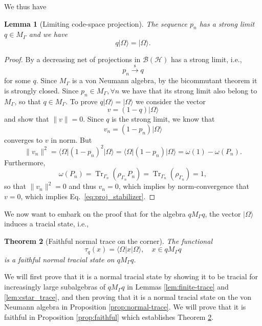 \documentclass[aps,pra,reprint,superscriptaddress]{revtex4-2}
\newcommand{\cB}{{\mathcal B}}
\newcommand{\cH}{{\mathcal H}}
\newcommand\G{\Gamma}
\renewcommand\r{\rho}
\newcommand\w{\omega}
\newcommand\W{\Omega}
\providecommand{\ket}[1]{\lvert #1\rangle}
\providecommand{\bra}[1]{\langle #1\rvert}
\providecommand{\Tr}{\operatorname{Tr}}
\providecommand{\norm}[1]{\lVert #1\rVert}
\newtheorem{theorem}{Theorem}
\newtheorem{lemma}[theorem]{Lemma}
\theoremstyle{definition}
\theoremstyle{remark}
\begin{document}
We thus have
\begin{lemma}[Limiting code-space projection]\label{lem:q_exists}
    The sequence $p_n$ has a strong limit $q \in M_\G$ and we have 
    \begin{equation}\label{eq:proj_stabilizer}
        q \ket{\W} = \ket{\W}.
    \end{equation}    
\end{lemma}
\begin{proof}
    By \cite[I.5.1.3]{Blackadar} a decreasing net of projections in $\cB(\cH)$ has
a strong limit, i.e.,
\begin{equation}
    p_n \xrightarrow{\mathrm{s}} q
\end{equation}
for some $q$. Since $M_\G$ is a von Neumann algebra, by the bicommutant theorem
\cite[I.9.1.2]{Blackadar} it is strongly closed. Since $p_n \in M_\G, \forall
n$ we have that its strong limit also belong to $M_\G$, so that $q \in M_\G$.
To prove $q \ket{\W} = \ket{\W}$ we consider the vector
\begin{equation}
    v = (1-q) \ket{\W}
\end{equation}
and show that $\norm{v} = 0$. Since $q$ is the strong limit, we know that 
\begin{equation}
    v_n = (1-p_n) \ket{\W}
\end{equation}
converges to $v$ in norm. But
\begin{equation}
    \norm{v_n}^2 = \bra{\W}(1-p_n)^2 \ket{\W} = \bra{\W}(1-p_n)\ket{\W} = \w(1)
    - \w(P_n).
\end{equation}
Furthermore,
\begin{equation}
    \w(P_n) = \Tr_{\G_n}(\r_{\G_n}P_n)
    = \Tr_{\G_n}(\r_{\G_n}) = 1,
\end{equation}
so that $\norm{v_n}^2 = 0$ and thus $v_n = 0$, which implies by
norm-convergence that $v = 0$, which implies Eq.~\eqref{eq:proj_stabilizer}.
\end{proof}
We now want to embark on the proof that for the algebra $qM_\G q$, the vector
$\ket{\W}$ induces a tracial state, i.e.,
\begin{theorem}[Faithful normal trace on the  corner]\label{thm:faithful_normal_trace}
    The functional
    \begin{equation}
        \tau_q(x) = \bra{\W} x \ket{\W},\quad x \in q M_\G q
    \end{equation}
    is a faithful normal tracial state on $q M_\G q$.
\end{theorem}
We will first prove that it is a normal tracial state by showing it to be tracial for increasingly large subalgebras of $qM_\G q$ in Lemmas \ref{lem:finite-trace} and \ref{lem:cstar_trace}, and then proving that it is a normal tracial state on the von Neumann algebra in Proposition \ref{prop:normal-trace}. We will prove that it is faithful in Proposition \ref{prop:faithful} which establishes Theorem \ref{thm:faithful_normal_trace}.
\end{document}
